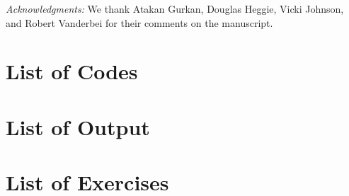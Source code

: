 \bigskip
\bigskip
{\it Acknowledgments:}
We thank Atakan Gurkan, Douglas Heggie, Vicki Johnson, and Robert
Vanderbei for their comments on the manuscript.


\newpage

\hbox{}

\newpage

\tableofcontents

\newpage





\hbox{}

\newpage


\listoffigures

\chapter*{List of Codes}


\chapter*{List of Output}



\chapter*{List of Exercises}




